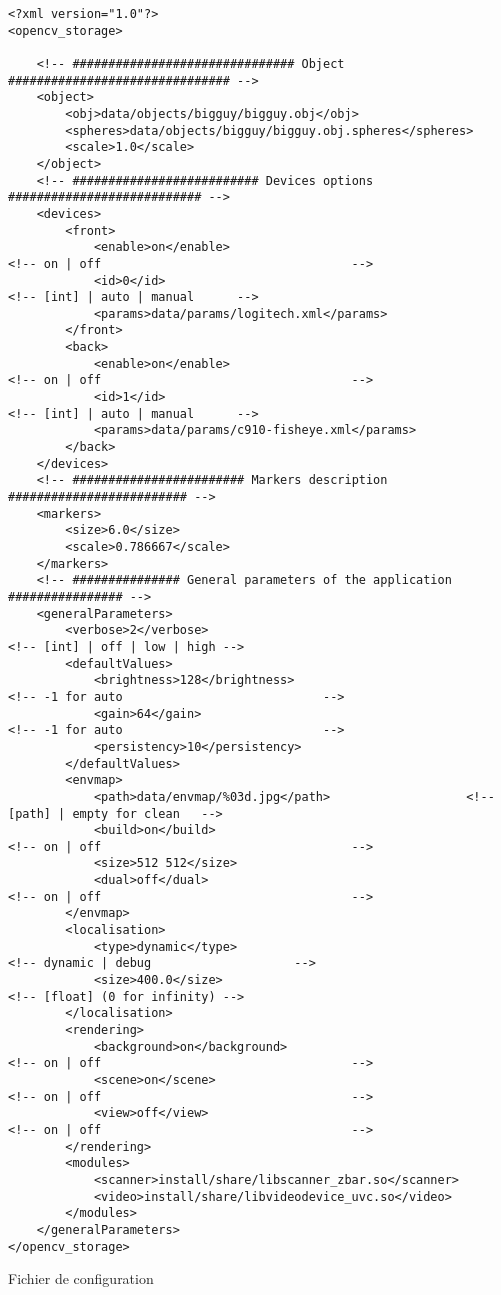 \documentclass[10pt,a4paper,twoside,twocolumn]{report}
\begin{document}
\begin{code*}[ht!]\centering

	\lstset{language=XML,tabsize=2}
	\begin{lstlisting}
<?xml version="1.0"?>
<opencv_storage>
	
	<!-- ############################### Object ############################### -->
	<object>
		<obj>data/objects/bigguy/bigguy.obj</obj>
		<spheres>data/objects/bigguy/bigguy.obj.spheres</spheres>
		<scale>1.0</scale>
	</object>
	<!-- ########################## Devices options ########################### -->
	<devices>
		<front>
			<enable>on</enable>												<!-- on | off									-->
			<id>0</id>																<!-- [int] | auto | manual		-->
			<params>data/params/logitech.xml</params>
		</front>
		<back>
			<enable>on</enable>												<!-- on | off									-->
			<id>1</id>																<!-- [int] | auto | manual		-->
			<params>data/params/c910-fisheye.xml</params>
		</back>
	</devices>
	<!-- ######################## Markers description ######################### -->
	<markers>
		<size>6.0</size>
		<scale>0.786667</scale>
	</markers>
	<!-- ############### General parameters of the application ################ -->
	<generalParameters>
		<verbose>2</verbose>												<!-- [int] | off | low | high -->
		<defaultValues>
			<brightness>128</brightness>							<!-- -1 for auto							-->
			<gain>64</gain>														<!-- -1 for auto							-->
			<persistency>10</persistency>
		</defaultValues>
		<envmap>
			<path>data/envmap/%03d.jpg</path>					<!-- [path] | empty for clean	-->
			<build>on</build>													<!-- on | off									-->
			<size>512 512</size>
			<dual>off</dual>													<!-- on | off									-->
		</envmap>
		<localisation>
			<type>dynamic</type>											<!-- dynamic | debug					-->
			<size>400.0</size>												<!-- [float] (0 for infinity) -->
		</localisation>		
		<rendering>
			<background>on</background>								<!-- on | off									-->
			<scene>on</scene>													<!-- on | off									-->
			<view>off</view>													<!-- on | off									-->
		</rendering>
		<modules>
			<scanner>install/share/libscanner_zbar.so</scanner>
			<video>install/share/libvideodevice_uvc.so</video>
		</modules>
	</generalParameters>
</opencv_storage>
	\end{lstlisting}
	\caption{Fichier de configuration}
	\label{code:config}
\end{code*}
\end{document}
